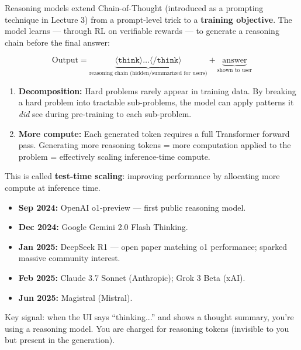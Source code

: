 \documentclass[11pt, a4paper]{article}
\begin{document}
\begin{defbox}
Reasoning models extend Chain-of-Thought (introduced as a prompting technique in Lecture 3) from a prompt-level trick to a \textbf{training objective}. The model learns --- through RL on verifiable rewards --- to generate a reasoning chain before the final answer:

\[
\text{Output} = \underbrace{\langle\texttt{think}\rangle \ldots \langle\texttt{/think}\rangle}_{\text{reasoning chain (hidden/summarized for users)}} + \underbrace{\text{answer}}_{\text{shown to user}}
\]
\end{defbox}

\begin{notebox}[Two Intuitions for Why More Tokens = Better Reasoning]
\begin{enumerate}[leftmargin=1.5em]
  \item \textbf{Decomposition:} Hard problems rarely appear in training data. By breaking a hard problem into tractable sub-problems, the model can apply patterns it \emph{did} see during pre-training to each sub-problem.
  \item \textbf{More compute:} Each generated token requires a full Transformer forward pass. Generating more reasoning tokens = more computation applied to the problem = effectively scaling inference-time compute.
\end{enumerate}
This is called \textbf{test-time scaling}: improving performance by allocating more compute at inference time.
\end{notebox}

\begin{notebox}
\begin{itemize}[leftmargin=1.5em]
  \item \textbf{Sep 2024:} OpenAI o1-preview --- first public reasoning model.
  \item \textbf{Dec 2024:} Google Gemini 2.0 Flash Thinking.
  \item \textbf{Jan 2025:} DeepSeek R1 --- open paper matching o1 performance; sparked massive community interest.
  \item \textbf{Feb 2025:} Claude 3.7 Sonnet (Anthropic); Grok 3 Beta (xAI).
  \item \textbf{Jun 2025:} Magistral (Mistral).
\end{itemize}
Key signal: when the UI says ``thinking...'' and shows a thought summary, you're using a reasoning model. You are charged for reasoning tokens (invisible to you but present in the generation).
\end{notebox}
\end{document}
